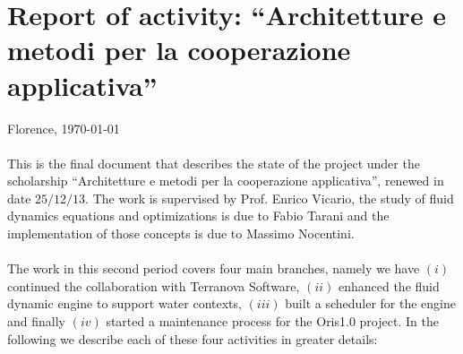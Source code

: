 \documentclass[twoside,openright,titlepage,fleqn,
headinclude,11pt,a4paper,BCOR5mm,footinclude ]{scrbook}
\begin{document}
\frenchspacing
\raggedbottom
{}
\pagestyle{plain}
%
\pagestyle{scrheadings}

\lstset{
	language = java
	, numbers = left 
	, basicstyle=\sffamily%
	, tabsize=2
	, captionpos=b
	, breaklines=true
	, showspaces=false
	, showstringspaces=false
}
\chapter*{Report of activity: ``Architetture e metodi per la 
cooperazione applicativa'' }
Florence, \today
\\\\
This is the final document that describes the state of the project
under the scholarship ``Architetture e metodi per la cooperazione
applicativa'', renewed in date $25/12/13$.  The work is supervised by
Prof. Enrico Vicario, the study of fluid dynamics equations and
optimizations is due to Fabio Tarani and the implementation of those
concepts is due to Massimo Nocentini.
\\\\
The work in this second period covers four main branches, namely we
have $(i)$ continued the collaboration with Terranova Software, $(ii)$
enhanced the fluid dynamic engine to support water contexts, $(iii)$
built a scheduler for the engine and finally $(iv)$ started a
maintenance process for the Oris1.0 project. In the following we
describe each of these four activities in greater details:
\end{document}
